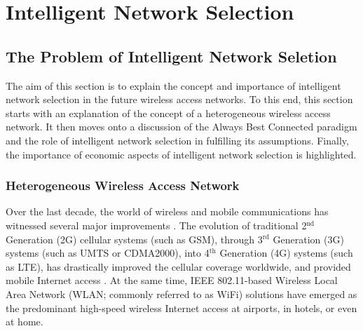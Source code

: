 \chapter{Intelligent Network Selection} %
\label{cha:intelligent}

\minitoc
\vspace{10mm}

\section{The Problem of Intelligent Network Seletion} %
\label{sec:the_problem_of_intelligent_network_seletion_intelligent}
The aim of this section is to explain the concept and importance of intelligent network selection in the future wireless access networks. To this end, this section starts with an explanation of the concept of a heterogeneous wireless access network. It then moves onto a discussion of the Always Best Connected paradigm and the role of intelligent network selection in fulfilling its assumptions. Finally, the importance of economic aspects of intelligent network selection is highlighted.

\subsection{Heterogeneous Wireless Access Network} %
\label{sub:heterogeneous_wireless_access_network_intelligent}
Over the last decade, the world of wireless and mobile communications has witnessed several major improvements \cite{ABC03}. The evolution of traditional 2$^\text{nd}$ Generation (2G) cellular systems (such as GSM), through 3$^{\text{rd}}$ Generation (3G) systems (such as UMTS or CDMA2000), into 4$^{\text{th}}$ Generation (4G) systems (such as LTE), has drastically improved the cellular coverage worldwide, and provided mobile Internet access \cite{HossainBeaubrun09, HossainTalebiFard09}. At the same time, IEEE 802.11-based Wireless Local Area Network (WLAN; commonly referred to as WiFi) solutions have emerged as the predominant high-speed wireless Internet access at airports, in hotels, or even at home.


